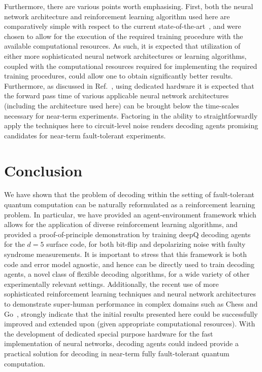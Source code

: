 \documentclass[twocolumn,preprintnumbers,amsmath,amssymb,notitlepage,nofootinbib,longbibliography,superscriptaddress,aps,pra,10pt]{revtex4-1}
\begin{document}
	Furthermore, there are various points worth emphasising.
	First, both the neural network architecture and reinforcement learning algorithm used here are comparatively simple with respect to the current state-of-the-art~\cite{RLmnih2016asynchronous,RLSilver17b,RLsilver2017mastering,RLSilver2016}, and were chosen to allow for the execution of the required training procedure with the available computational resources.
	As such, it is expected that utilization of either more sophisticated neural network architectures or learning algorithms, coupled with the computational resources required for implementing the required training procedures, could allow one to obtain significantly better results.
	Furthermore, as discussed in Ref.~\cite{chamberland2018deep}, using dedicated hardware it is expected that the forward pass time of various applicable neural network architectures (including the architecture used here) can be brought below the time-scales necessary for near-term experiments.
	Factoring in the ability to straightforwardly apply the techniques here to circuit-level noise renders decoding agents promising candidates for near-term fault-tolerant experiments.

\section{Conclusion}\label{s:conclusions}

	We have shown that the problem of decoding within the setting of fault-tolerant quantum computation can be naturally reformulated as a reinforcement learning problem.
	In particular, we have provided an agent-environment framework which allows for the application of diverse reinforcement learning algorithms, and provided a proof-of-principle demonstration by training deepQ decoding agents for the $d=5$ surface code, for both bit-flip and depolarizing noise with faulty syndrome measurements.
	It is important to stress that this framework is both code and error model agnostic, and hence can be directly used to train decoding agents, a novel class of flexible decoding algorithms, for a wide variety of other experimentally relevant settings.
	Additionally, the recent use of more sophisticated reinforcement learning techniques and neural network architectures to demonstrate super-human performance in complex domains such as Chess and Go~\cite{RLSilver17b,RLsilver2017mastering,RLSilver2016}, strongly indicate that the initial results presented here could be successfully improved and extended upon (given appropriate computational resources).
	With the development of dedicated special purpose hardware for the fast implementation of neural networks, decoding agents could indeed provide a practical solution for decoding in near-term fully fault-tolerant quantum computation.
\end{document}

